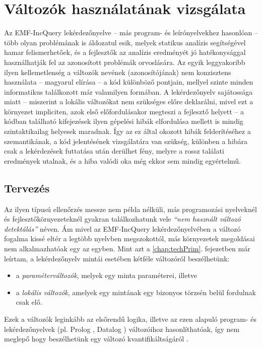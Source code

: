 \chapter{Változók használatának vizsgálata}
\label{chap:varUsage}
%
%
Az EMF-IncQuery lekérdezőnyelve -- más program- és leírónyelvekhez hasonlóan -- több olyan problémának is áldozatul esik, melyek statikus analízis segítségével hamar felismerhetőek, és a fejlesztők az analízis eredményét jó hatékonysággal használhatják fel az azonosított problémák orvoslására.
Az egyik leggyakoribb ilyen kellemetlenség a változók nevének (azonosítójának) nem konzisztens használata -- magyarul elírása -- a kód különböző pontjain, mellyel szinte minden informatikus találkozott már valamilyen formában.
A lekérdezőnyelv sajátossága miatt -- miszerint a lokális változókat nem szükséges előre deklarálni, mivel ezt a környezet impliciten, azok első előfordulásakor megteszi a fejlesztő helyett -- a kódban található kifejezések ilyen gépelési hibák elfordulása mellett is mindig szintaktikailag helyesek maradnak.
Így az ez által okozott hibák felderítéséhez a szemantikának, a kód jelentésének vizsgálatára van szükség, különben a hibára csak a lekérdezések futtatása után derülhet fény, melyre a rossz találati eredmények utalnak, és a hiba valódi oka még ekkor sem mindig egyértelmű.

\section{Tervezés}

Az ilyen típusú ellenőrzés messze nem példa nélküli, más programozási nyelveknél és fejlesztőkörnyezeteknél gyakran találkozhatunk vele \emph{``nem használt változó detektálás''} néven.
Ám mivel az EMF-IncQuery lekérdezőnyelvében a változó fogalma kissé eltér a legtöbb nyelvben megszokottól, más környezetek megoldásai nem alkalmazhatóak egy az egyben.
Mint azt a \ref{chap:techPrim}. fejezetben már leírtam, a lekérdezőnyelv mintái esetében kétféle változóról beszélhetünk:
\begin{itemize}
    \item a \emph{paraméterváltozók}, melyek egy minta paraméterei, illetve
    \item a \emph{lokális változók}, amelyek egy mintának egy bizonyos törzsén belül fordulnak csak elő.
\end{itemize}
Ezek a változók leginkább az elsőrendű logika, illetve az ezen alapuló program- és lekérdezőnyelvek (pl. Prolog \cite{Colmerauer93thebirth}, Datalog \cite{Ceri:1989:YAW:627272.627357}) változóihoz hasonlíthatóak, így nem meglepő hogy beszélhetünk egy változó kvantifikáltságáról \cite{Huth:2004:LCS:975331}.

